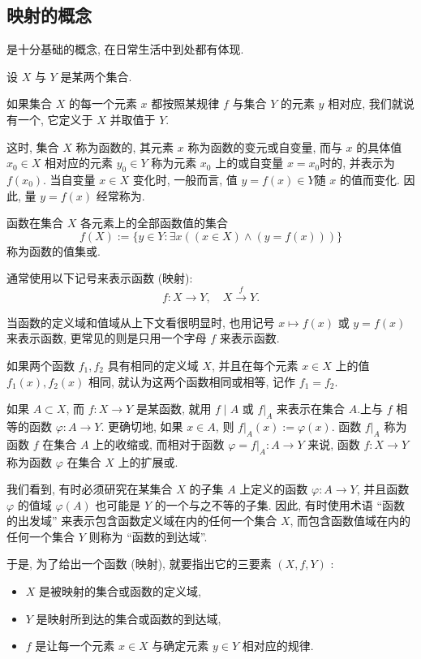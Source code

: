\documentclass{ctexart}
\begin{document}
\subsection{映射的概念} 是十分基础的概念, 在日常生活中到处都有体现.  

设 $X$ 与 $Y$ 是某两个集合.

如果集合 $X$ 的每一个元素 $x$ 都按照某规律 $f$ 与集合 $Y$ 的元素 $y$ 相对应, 我们就说有一个, 它定义于 $X$ 并取值于 $Y$.

这时, 集合 $X$ 称为函数的, 其元素 $x$ 称为函数的变元或{自变量}, 而与 $x$ 的具体值 $x_0 \in X$ 相对应的元素 $y_0 \in Y$ 称为元素 $x_0$ 上的或自变量 $x=x_0$时的, 并表示为 $f\left(x_0\right)$. 当自变量 $x \in X$ 变化时, 一般而言, 值 $y=f(x) \in Y$随 $x$ 的值而变化. 因此, 量 $y=f(x)$ 经常称为.

函数在集合 $X$ 各元素上的全部函数值的集合
$$
f(X):=\{y \in Y : \exists x((x \in X) \wedge(y=f(x)))\}
$$
称为函数的值集或.

通常使用以下记号来表示函数 (映射):
$$
f: X \rightarrow Y, \quad X \xrightarrow{f} Y .
$$

当函数的定义域和值域从上下文看很明显时, 也用记号 $x \mapsto f(x)$ 或 $y=f(x)$来表示函数, 更常见的则是只用一个字母 $f$ 来表示函数.

如果两个函数 $f_1, f_2$ 具有相同的定义域 $X$, 并且在每个元素 $x \in X$ 上的值 $f_1(x), f_2(x)$ 相同, 就认为这两个函数相同或相等, 记作 $f_1=f_2$.

如果 $A \subset X$, 而 $f: X \rightarrow Y$ 是某函数, 就用 $f \mid A$ 或 $\left.f\right|_A$ 来表示在集合 $A$.上与 $f$ 相等的函数 $\varphi: A \rightarrow Y$. 更确切地, 如果 $x \in A$, 则 $\left.f\right|_A(x):=\varphi(x)$. 函数 $\left.f\right|_A$ 称为函数 $f$ 在集合 $A$ 上的收缩或, 而相对于函数 $\varphi=\left.f\right|_A: A \rightarrow Y$ 来说, 函数 $f: X \rightarrow Y$ 称为函数 $\varphi$ 在集合 $X$ 上的扩展或.

我们看到, 有时必须研究在某集合 $X$ 的子集 $A$ 上定义的函数 $\varphi: A \rightarrow Y$, 并且函数 $\varphi$ 的值域 $\varphi(A)$ 也可能是 $Y$ 的一个与之不等的子集. 因此, 有时使用术语 “函数的出发域” 来表示包含函数定义域在内的任何一个集合 $X$, 而包含函数值域在内的任何一个集合 $Y$ 则称为 “函数的到达域”.

于是, 为了给出一个函数 (映射), 就要指出它的三要素 $(X, f, Y)$ :
\begin{itemize}
    \item  $X$ 是被映射的集合或函数的定义域,
    \item $Y$ 是映射所到达的集合或函数的到达域,
    \item $f$ 是让每一个元素 $x \in X$ 与确定元素 $y \in Y$ 相对应的规律.
\end{itemize}
\end{document}
